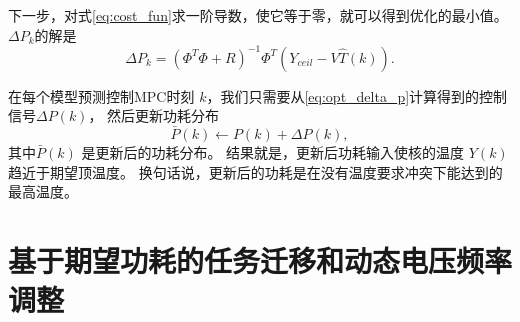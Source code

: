 下一步，对式\eqref{eq:cost_fun}求一阶导数，使它等于零，就可以得到优化的最小值。
$\Delta P_k$的解是
\begin{equation}\label{eq:opt_delta_p}
\Delta P_k = (\Phi^T \Phi + R)^{-1}\Phi^T(Y_{ceil}-V\hat{T}(k)).
\end{equation}

在每个模型预测控制MPC时刻 $k$，我们只需要从\eqref{eq:opt_delta_p}计算得到的控制信号$\Delta P(k)$， 
然后更新功耗分布
\begin{equation}\label{eq:power_update}
\bar{P}(k) \gets P(k) + \Delta P(k),
\end{equation}
其中$\bar{P}(k)$  是更新后的功耗分布。
结果就是，更新后功耗输入使核的温度 $Y(k)$ 趋近于期望顶温度。
换句话说，更新后的功耗是在没有温度要求冲突下能达到的最高温度。

\section{基于期望功耗的任务迁移和动态电压频率调整}\label{sec:dtm_mpc}

































